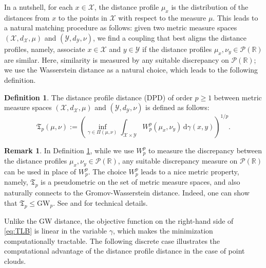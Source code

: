 \documentclass[11pt,letterpaper]{article}
\theoremstyle{definition}
\newtheorem{definition}{Definition}
\newtheorem{remark}{Remark}
\numberwithin{equation}{section}
\newcommand{\cX}{\mathcal{X}}
\newcommand{\cY}{\mathcal{Y}}
\newcommand{\R}{\mathbb{R}}
\begin{document}
In a nutshell, for each $x \in \cX$, the distance profile $\mu_x$ is the distribution of the distances from $x$ to the points in $\cX$ with respect to the measure $\mu$. This leads to a natural matching procedure as follows: given two metric measure spaces $(\cX, d_\cX, \mu)$ and $(\cY, d_\cY, \nu)$, we find a coupling that best aligns the distance profiles, namely, associate $x \in \cX$ and $y \in \cY$ if the distance profiles $\mu_x, \nu_y \in \mathscr{P}(\R)$ are similar. Here, similarity is measured by any suitable discrepancy on $\mathscr{P}(\R)$; we use the Wasserstein distance as a natural choice, which leads to the following definition.

\begin{definition}
    \label{def:distance_profile_distance}
    The distance profile distance (DPD) of order $p \ge 1$ between metric measure spaces $(\cX, d_\cX, \mu)$ and $(\cY, d_\cY, \nu)$ is defined as follows:
    \begin{equation}
        \label{eq:TLB}
        \mathfrak{T}_p(\mu, \nu) := \left(\inf_{\gamma \in \Pi(\mu, \nu)} \int_{\cX \times \cY} W_p^p(\mu_x, \nu_y) \, \mathrm{d} \gamma(x, y)\right)^{1 / p}.
    \end{equation}
\end{definition}

\begin{remark}
    \label{rmk:TLB}
    In Definition \ref{def:distance_profile_distance}, while we use $W_p^p$ to measure the discrepancy between the distance profiles $\mu_x, \nu_y \in \mathscr{P}(\R)$, any suitable discrepancy measure on $\mathscr{P}(\R)$ can be used in place of $W_p^p$. The choice $W_p^p$ leads to a nice metric property, namely, $\mathfrak{T}_p$ is a pseudometric on the set of metric measure spaces, and also naturally connects to the Gromov-Wasserstein distance. Indeed, one can show that $\mathfrak{T}_p \le \mathrm{GW}_p$. See \cite{memoli2011gromov} and \cite{memoli2022distance} for technical details.
\end{remark}

Unlike the GW distance, the objective function on the right-hand side of \eqref{eq:TLB} is linear in the variable $\gamma$, which makes the minimization computationally tractable. The following discrete case illustrates the computational advantage of the distance profile distance in the case of point clouds.
\end{document}

